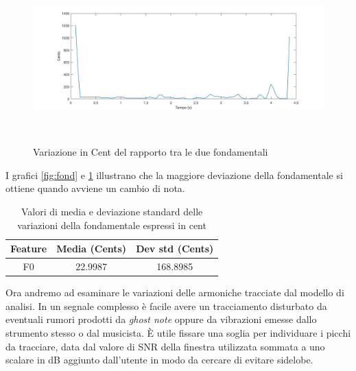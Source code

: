 \documentclass[12pt]{report}
\begin{document}
\begin{figure}[htbp]
\centerline{\includegraphics[height=65mm]{img/diff_fond}}
\caption{Variazione in Cent del rapporto tra le due fondamentali}
\label{fig:diff_fond}
\end{figure}

I grafici \ref{fig:fond} e \ref{fig:diff_fond} illustrano che la maggiore deviazione della fondamentale si ottiene quando avviene un cambio di nota.

\clearpage

\begin{table}[htbp]
\begin{center}
\begin{tabular}{|c|c|c|}
\hline
Feature & Media (Cents) & Dev std (Cents)\\
\hline
F0 & 22.9987 & 168.8985\\
\hline
\end{tabular}
\end{center}
\caption{Valori di media e deviazione standard delle variazioni della fondamentale espressi in cent}
\label{tab:diff_fond}
\end{table}
Ora andremo ad esaminare le variazioni delle armoniche tracciate dal modello di analisi. In un segnale complesso è facile avere un tracciamento disturbato da eventuali rumori prodotti da {\itshape ghost note} oppure da vibrazioni emesse dallo strumento stesso o dal musicista. È utile fissare una soglia per individuare i picchi da tracciare, data dal valore di SNR della finestra utilizzata sommata a uno scalare in dB aggiunto dall'utente in modo da cercare di evitare sidelobe.
\end{document}
